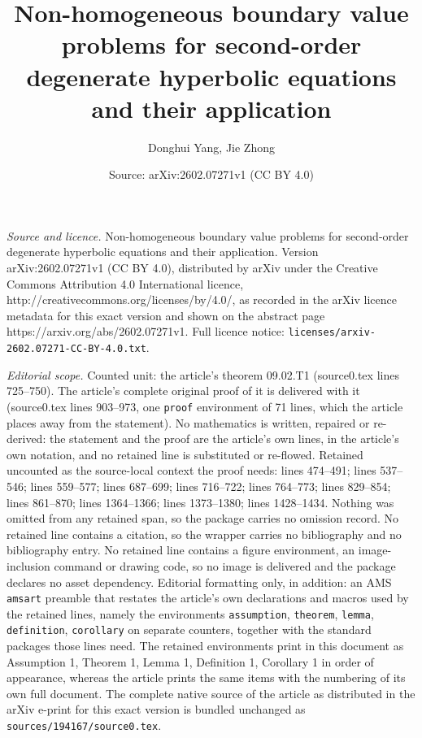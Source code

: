 \documentclass[10pt,a4paper]{amsart}
\title{Non-homogeneous boundary value problems for second-order degenerate hyperbolic equations and their application}
\author{Donghui Yang, Jie Zhong}
\date{Source: arXiv:2602.07271v1 (CC BY 4.0)}
\begin{document}
\maketitle

\noindent\emph{Source and licence.} Non-homogeneous boundary value problems for second-order degenerate hyperbolic equations and their application. Version arXiv:2602.07271v1 (CC BY 4.0), distributed by arXiv under the Creative Commons Attribution 4.0 International licence, http://creativecommons.org/licenses/by/4.0/, as recorded in the arXiv licence metadata for this exact version and shown on the abstract page https://arxiv.org/abs/2602.07271v1. Full licence notice: \texttt{licenses/arxiv-2602.07271-CC-BY-4.0.txt}.\par\smallskip

\noindent\textit{Editorial scope.} Counted unit: the article's theorem 09.02.T1 (source0.tex lines 725--750). The article's complete original proof of it is delivered with it (source0.tex lines 903--973, one \texttt{proof} environment of 71 lines, which the article places away from the statement). No mathematics is written, repaired or re-derived: the statement and the proof are the article's own lines, in the article's own notation, and no retained line is substituted or re-flowed.  Retained uncounted as the source-local context the proof needs: lines 474--491; lines 537--546; lines 559--577; lines 687--699; lines 716--722; lines 764--773; lines 829--854; lines 861--870; lines 1364--1366; lines 1373--1380; lines 1428--1434.  Nothing was omitted from any retained span, so the package carries no omission record.  No retained line contains a citation, so the wrapper carries no bibliography and no bibliography entry.  No retained line contains a figure environment, an image-inclusion command or drawing code, so no image is delivered and the package declares no asset dependency.  Editorial formatting only, in addition: an AMS \texttt{amsart} preamble that restates the article's own declarations and macros used by the retained lines, namely the environments \texttt{assumption}, \texttt{theorem}, \texttt{lemma}, \texttt{definition}, \texttt{corollary} on separate counters, together with the standard packages those lines need.  The retained environments print in this document as Assumption 1, Theorem 1, Lemma 1, Definition 1, Corollary 1 in order of appearance, whereas the article prints the same items with the numbering of its own full document.  The complete native source of the article as distributed in the arXiv e-print for this exact version is bundled unchanged as \texttt{sources/194167/source0.tex}.
\end{document}

